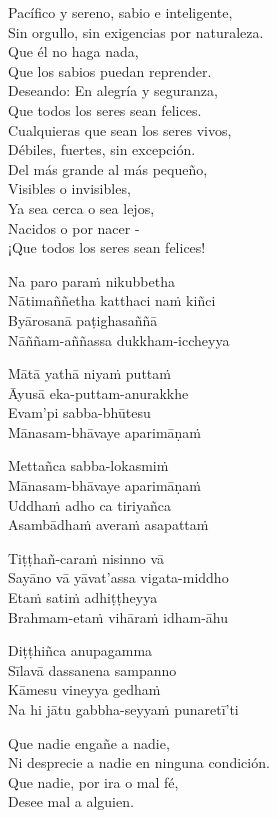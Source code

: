 Pacífico y sereno, sabio e inteligente,\\
Sin orgullo, sin exigencias por naturaleza.\\
Que él no haga nada,\\
Que los sabios puedan reprender.\\
Deseando: En alegría y seguranza,\\
Que todos los seres sean felices.\\
Cualquieras que sean los seres vivos,\\
Débiles, fuertes, sin excepción.\\
Del más grande al más pequeño,\\
Visibles o invisibles,\\
Ya sea cerca o sea lejos,\\
Nacidos o por nacer -\\
¡Que todos los seres sean felices!

\clearpage

Na paro paraṁ nikubbetha\\
Nātimaññetha katthaci naṁ kiñci\\
Byārosanā paṭighasaññā\\
Nāññam-aññassa dukkham-iccheyya

Mātā yathā niyaṁ puttaṁ\\
Āyusā eka-puttam-anurakkhe\\
Evam'pi sabba-bhūtesu\\
Mānasam-bhāvaye aparimāṇaṁ

Mettañca sabba-lokasmiṁ\\
Mānasam-bhāvaye aparimāṇaṁ\\
Uddhaṁ adho ca tiriyañca\\
Asambādhaṁ averaṁ asapattaṁ

Tiṭṭhañ-caraṁ nisinno vā\\
Sayāno vā yāvat'assa vigata-middho\\
Etaṁ satiṁ adhiṭṭheyya\\
Brahmam-etaṁ vihāraṁ idham-āhu

Diṭṭhiñca anupagamma\\
Sīlavā dassanena sampanno\\
Kāmesu vineyya gedhaṁ\\
Na hi jātu gabbha-seyyaṁ punaretī'ti

\clearpage

Que nadie engañe a nadie,\\
Ni desprecie a nadie en ninguna condición.\\
Que nadie, por ira o mal fé,\\
Desee mal a alguien.

